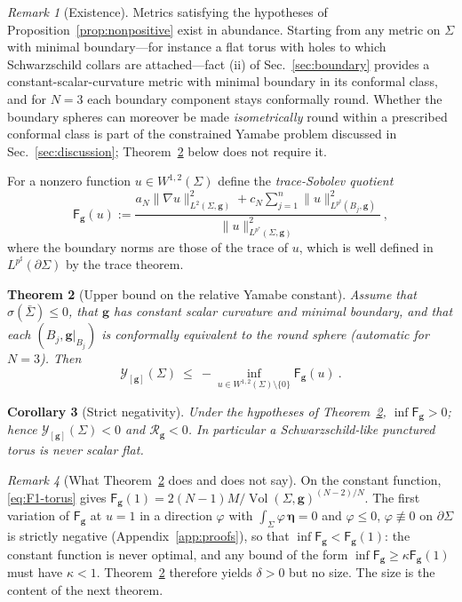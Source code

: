 \documentclass[aps,prd,reprint,amsmath,amssymb,nofootinbib,longbibliography]{revtex4-2}
\DeclareMathOperator{\Vol}{Vol}
\newcommand{\g}{\mathbf{g}}                 %
\newcommand{\Rs}{\mathcal{R}}               %
\newcommand{\vol}{\boldsymbol{\eta}}        %
\newcommand{\Sigbar}{\bar{\Sigma}}          %
\newcommand{\Y}{\mathcal{Y}}                %
\newcommand{\pstar}{p^{*}}
\newcommand{\psharp}{p^{\sharp}}
\newcommand{\aN}{a_N}
\newcommand{\cN}{c_N}
\newcommand{\Fq}{\mathsf{F}}                %
\theoremstyle{plain}
\newtheorem{theorem}{Theorem}
\newtheorem{corollary}[theorem]{Corollary}
\theoremstyle{definition}
\theoremstyle{remark}
\newtheorem{remark}[theorem]{Remark}
\begin{document}
\begin{remark}[Existence]
\label{rem:existence}
Metrics satisfying the hypotheses of Proposition~\ref{prop:nonpositive} exist in abundance. Starting from any metric on $\Sigma$ with minimal boundary---for instance a flat torus with holes to which Schwarzschild collars are attached---fact (ii) of Sec.~\ref{sec:boundary} provides a constant-scalar-curvature metric with minimal boundary in its conformal class, and for $N=3$ each boundary component stays conformally round. Whether the boundary spheres can moreover be made \emph{isometrically} round within a prescribed conformal class is part of the constrained Yamabe problem discussed in Sec.~\ref{sec:discussion}; Theorem~\ref{thm:upper-bound} below does not require it.
\end{remark}

For a nonzero function $u\in W^{1,2}(\Sigma)$ define the \emph{trace-Sobolev quotient}
\begin{equation}
\label{eq:trace-sobolev}
\Fq_{\g}(u):=\frac{\aN\|\nabla u\|^2_{L^2(\Sigma,\g)}+\cN\sum_{j=1}^n\|u\|^2_{L^{\psharp}(B_j,\g)}}{\|u\|^2_{L^{\pstar}(\Sigma,\g)}}\ ,
\end{equation}
where the boundary norms are those of the trace of $u$, which is well defined in $L^{\psharp}(\partial\Sigma)$ by the trace theorem.

\begin{theorem}[Upper bound on the relative Yamabe constant]
\label{thm:upper-bound}
Assume that $\sigma(\Sigbar)\le0$, that $\g$ has constant scalar curvature and minimal boundary, and that each $(B_j,\g|_{B_j})$ is conformally equivalent to the round sphere (automatic for $N=3$). Then
\begin{equation}
\label{eq:upper-bound}
\Y_{[\g]}(\Sigma)\ \le\ -\inf_{u\in W^{1,2}(\Sigma)\setminus\{0\}}\Fq_{\g}(u)\ .
\end{equation}
\end{theorem}

\begin{corollary}[Strict negativity]
\label{cor:negative}
Under the hypotheses of Theorem~\ref{thm:upper-bound}, $\inf\Fq_\g>0$; hence $\Y_{[\g]}(\Sigma)<0$ and $\Rs_\g<0$. In particular a Schwarzschild-like punctured torus is never scalar flat.
\end{corollary}

\begin{remark}[What Theorem~\ref{thm:upper-bound} does and does not say]
\label{rem:sign}
On the constant function, \eqref{eq:F1-torus} gives $\Fq_\g(1)=2(N-1)M/\Vol(\Sigma,\g)^{(N-2)/N}$. The first variation of $\Fq_\g$ at $u=1$ in a direction $\varphi$ with $\int_\Sigma\varphi\,\vol=0$ and $\varphi\le0$, $\varphi\not\equiv0$ on $\partial\Sigma$ is strictly negative (Appendix~\ref{app:proofs}), so that $\inf\Fq_\g<\Fq_\g(1)$: the constant function is never optimal, and any bound of the form $\inf\Fq_\g\ge\kappa\Fq_\g(1)$ must have $\kappa<1$. Theorem~\ref{thm:upper-bound} therefore yields $\delta>0$ but no size. The size is the content of the next theorem.
\end{remark}
\end{document}
